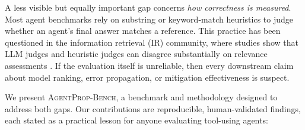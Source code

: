 \documentclass{article}
\newcommand{\bench}{\textsc{AgentProp-Bench}\xspace}
\begin{document}
A less visible but equally important gap concerns \emph{how correctness
is measured}.
Most agent benchmarks rely on substring or keyword-match heuristics to
judge whether an agent's final answer matches a reference.
This practice has been questioned in the information retrieval (IR)
community, where studies show that LLM judges and heuristic judges can
disagree substantially on relevance assessments
\citep{soboroff2024dont,thomas2024searcher,alaofi2024fooled}.
If the evaluation itself is unreliable, then every downstream claim about
model ranking, error propagation, or mitigation effectiveness is suspect.

We present \bench{}, a benchmark and methodology designed to address
both gaps.
Our contributions are reproducible, human-validated findings, each stated as a
practical lesson for anyone evaluating tool-using agents:
\end{document}
